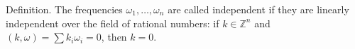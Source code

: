 Definition. The frequencies $\omega_1, \ldots, \omega_n$ are called independent if they are linearly independent over the field of rational numbers: if $k \in \mathbb{Z}^n$ and $(k, \omega) = \sum k_i \omega_i = 0$, then $k = 0$.
